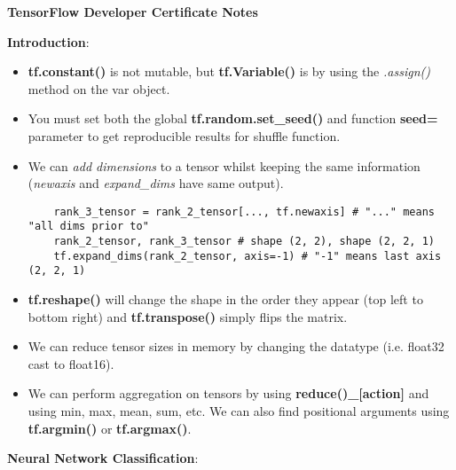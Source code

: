 \documentclass[11pt, a4paper]{article}
\begin{document}
	\begin{titlepage}
		\begin{center} \Huge \textbf{TensorFlow Developer Certificate Notes} \end{center}
		\tableofcontents
		\newpage
	\end{titlepage}
	
	
	\noindent \Large \textbf{Introduction}: \normalsize
	\begin{itemize}
		\item \textbf{tf.constant()} is not mutable, but \textbf{tf.Variable()} is by using the \textit{.assign()} method on the var object.
		\item You must set both the global \textbf{tf.random.set\_seed()} and function \textbf{seed=} parameter to get reproducible results for shuffle function.
		\item We can \textit{add dimensions} to a tensor whilst keeping the same information (\textit{newaxis} and \textit{expand\_dims} have same output).
	\begin{lstlisting}
	rank_3_tensor = rank_2_tensor[..., tf.newaxis] # "..." means "all dims prior to"
	rank_2_tensor, rank_3_tensor # shape (2, 2), shape (2, 2, 1) 
	tf.expand_dims(rank_2_tensor, axis=-1) # "-1" means last axis (2, 2, 1)  \end{lstlisting}
		\item \textbf{tf.reshape()} will change the shape in the order they appear (top left to bottom right) and \textbf{tf.transpose()} simply flips the matrix.
		\item We can reduce tensor sizes in memory by changing the datatype (i.e. float32 cast to float16). 
		\item We can perform aggregation on tensors by using \textbf{reduce()\_[action]} and using min, max, mean, sum, etc. We can also find positional arguments using \textbf{tf.argmin()} or \textbf{tf.argmax()}.
	\end{itemize} \vspace*{6mm}
	\noindent \Large \textbf{Neural Network Classification}: \normalsize
\end{document}
